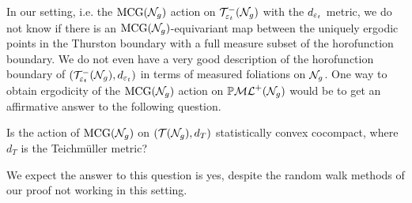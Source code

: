 \begin{remark}
  In our setting, i.e. the $\mathrm{MCG}(\mathcal{N}_g)$ action on $\mathcal{T}_{\varepsilon_t}^{-}(\mathcal{N}_g)$ with the $d_{\varepsilon_t}$ metric, we do not know if there is an $\mathrm{MCG}(\mathcal{N}_g)$-equivariant map between the uniquely ergodic points in the Thurston boundary with a full measure subset of the horofunction boundary.
  We do not even have a very good description of the horofunction boundary of $(\mathcal{T}_{\varepsilon_t}^{-}(\mathcal{N}_g), d_{\varepsilon_t})$ in terms of measured foliations on $\mathcal{N}_g$.
  One way to obtain ergodicity of the $\mathrm{MCG}(\mathcal{N}_g)$ action on $\mathbb{P}\mathcal{ML}^+(\mathcal{N}_g)$ would be to get an affirmative answer to the following question.
\begin{question}
  \label{ques:full-scc}
  Is the action of $\mathrm{MCG}(\mathcal{N}_g)$ on $(\mathcal{T}(\mathcal{N}_g), d_T)$ statistically convex cocompact, where $d_T$ is the Teichmüller metric?
\end{question}
We expect the answer to this question is yes, despite the random walk methods of our proof not working in this setting.
\end{remark}






